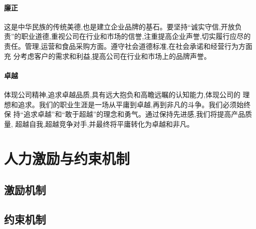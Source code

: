 \paragraph{廉正}
这是中华民族的传统美德,也是建立企业品牌的基石。要坚持“诚实守信,开放负
责”的职业道德,重视公司在行业和市场的信誉,注重提高企业声誉,切实履行应尽的
责任。管理,运营和食品采购方面。遵守社会道德标准,在社会承诺和经营行为方面充
分考虑客户的需求和利益,提高公司在行业和市场上的品牌声誉。

\paragraph{卓越}
体现公司精神,追求卓越品质,具有远大抱负和高瞻远瞩的认知能力,体现公司的
理想和追求。我们的职业生涯是一场从平庸到卓越,再到非凡的斗争。我们必须始终保
持“追求卓越”和“敢于超越”的理念和勇气。通过保持先进感,我们将提高产品质量,
超越自我,超越竞争对手,并最终将平庸转化为卓越和非凡。

\section{人力激励与约束机制}
\subsection{激励机制}

\subsection{约束机制}

